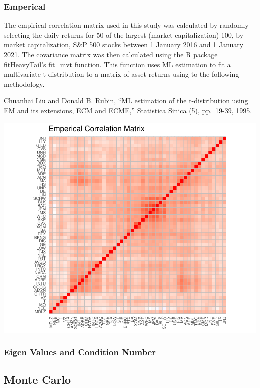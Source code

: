 \documentclass[11pt,preprint, authoryear]{elsarticle}
\numberwithin{equation}{section}
\numberwithin{figure}{section}
\numberwithin{table}{section}
\begin{document}
\hypertarget{emperical}{%
\subsubsection{\texorpdfstring{Emperical
\label{emp}}{Emperical }}\label{emperical}}

The empirical correlation matrix used in this study was calculated by
randomly selecting the daily returns for 50 of the largest (market
capitalization) 100, by market capitalization, S\&P 500 stocks between 1
January 2016 and 1 January 2021. The covariance matrix was then
calculated using the R package fitHeavyTail's fit\_mvt function. This
function uses ML estimation to fit a multivariate t-distribution to a
matrix of asset returns using to the following methodology.

Chuanhai Liu and Donald B. Rubin, ``ML estimation of the t-distribution
using EM and its extensions, ECM and ECME,'' Statistica Sinica (5),
pp.~19-39, 1995.

\includegraphics{Thesis_files/figure-latex/unnamed-chunk-1-1.pdf}

\hypertarget{eigen-values-and-condition-number}{%
\subsubsection{Eigen Values and Condition
Number}\label{eigen-values-and-condition-number}}

\hypertarget{monte-carlo}{%
\subsection{Monte Carlo}\label{monte-carlo}}
\end{document}
